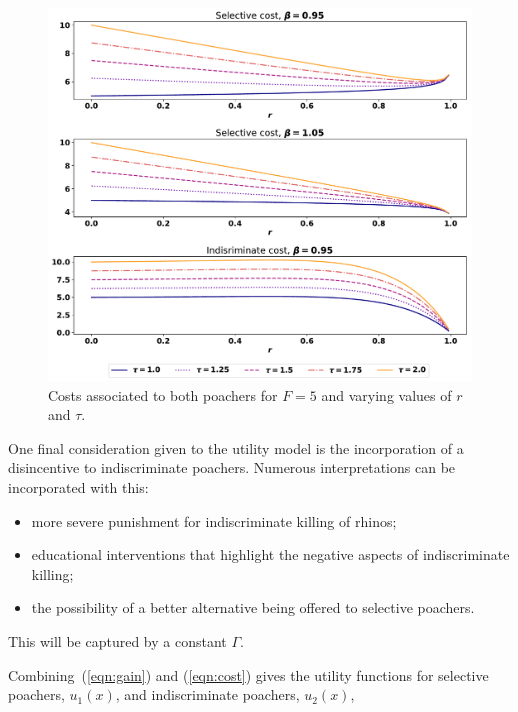 \documentclass[10pt]{article}
\begin{document}
\begin{figure}[!htbp]
    \begin{center}
        \includegraphics[width=\linewidth]{images/betas_curve.pdf}
        \caption{Costs associated to both poachers for \(F=5\) and varying
        values of \(r\) and \(\tau\).}\label{fig:CostCurves}
    \end{center}
\end{figure}

One final consideration given to the utility model is the incorporation of a
disincentive to indiscriminate poachers. Numerous interpretations can be
incorporated with this:

\begin{itemize}
    \item more severe punishment for indiscriminate killing of rhinos;
    \item educational interventions that highlight the negative aspects of
        indiscriminate killing;
    \item the possibility of a better alternative being offered to selective
        poachers.
\end{itemize}

This will be captured by a constant \(\Gamma\).

\noindent Combining~(\ref{eqn:gain}) and (\ref{eqn:cost}) gives the utility
functions for selective poachers, \(u_1(x)\), and indiscriminate poachers,
\(u_2(x)\),
\end{document}

